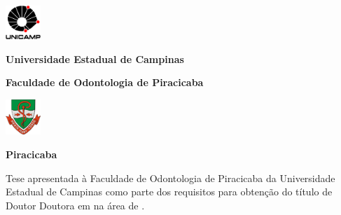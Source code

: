 \thispagestyle{plain}
\noindent%
\includegraphics[width=0.10\textwidth]{imagens/logo-unicamp}%
\begin{minipage}[b]{0.7\textwidth}
	\centering
	\textbf{Universidade Estadual de Campinas} \\
\vspace{0.5cm}

\textbf{Faculdade de Odontologia de Piracicaba}
\end{minipage}%
\includegraphics[width=0.10\textwidth]{imagens/logo-fop}

\vspace{4cm}
\begin{center}
	{\Large\textsc{\autor}}
\end{center}
\vspace{4cm}
\begin{center}
	{\Large\textbf{\textsc{\titulo}}}
\end{center}
\vfill
\begin{center}
	\textbf{Piracicaba \\ \ano}
\end{center}





\cleardoublepage


\thispagestyle{plain}


\begin{center}
	
	{\large\textbf{\textsc{\autor}}}
	
	
\end{center}
\vfill


\vfill
\begin{center}
	{\Large\textbf{\textsc{\titulo}}}
\end{center}
\vfill

\begin{flushright}
	\begin{minipage}[c]{.5\textwidth}
		Tese apresentada à Faculdade de Odontologia de Piracicaba da Universidade Estadual de Campinas como parte dos requisitos para obtenção do título de 
		\ifx\femaleAuthor\undefined
		Doutor
		\else
		Doutora
		\fi
		em \titulodoc{} na área de \areadoc .
		
		\end{minipage}
\end{flushright}
\vspace{.5cm}

